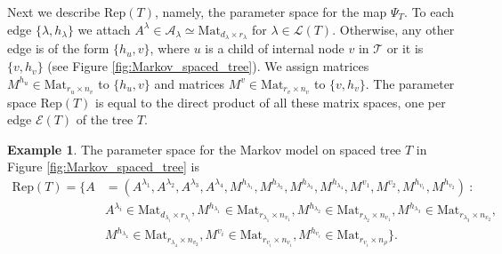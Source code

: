 \documentclass[12pt]{article}
\theoremstyle{definition}
\newtheorem{example}[theorem]{Example}
\numberwithin{theorem}{section}
\begin{document}
Next we describe $\mathrm{Rep}(T)$, namely, the parameter space for the map $\Psi_T$. To each edge $\{\lambda, h_{\lambda}\}$ we attach $A^\lambda \in \mathcal{A}_\lambda \simeq \mathrm{Mat}_{d_\lambda \times r_\lambda}$ for $\lambda \in \mathcal{L}(T)$.  Otherwise, any other edge is of the form $\{h_u, v\}$, where $u$ is a child of internal node $v$ in $\mathscr{T}$ or it is $\{v, h_v\}$ (see Figure \ref{fig:Markov_spaced_tree}). We assign matrices $M^{h_u}  \in \mathrm{Mat}_{r_u \times n_v}$ to $\{h_u, v\}$ and matrices $M^v \in \mathrm{Mat}_{r_v \times n_v}$ to $\{v, h_v\}$. The parameter space $\mathrm{Rep}(T)$ is equal to the direct product of all these matrix spaces, one per edge $\mathcal{E}(T)$ of the tree $T$. 
\begin{example}
    The parameter space for the Markov model on spaced tree $T$ in Figure \ref{fig:Markov_spaced_tree} is
\begin{align*}
    \mathrm{Rep}(T) = \{A&=(A^{\lambda_1}, A^{\lambda_2}, A^{\lambda_3}, A^{\lambda_4}, M^{h_{\lambda_1}}, M^{h_{\lambda_2}}, M^{h_{\lambda_3}}, M^{h_{\lambda_4}}, M^{v_1}, M^{v_2}, M^{h_{v_1}}, M^{h_{v_2}})~:~\\
    &A^{\lambda_i} \in \mathrm{Mat}_{d_{\lambda_i} \times r_{\lambda_i}}, M^{h_{\lambda_1}}\in\mathrm{Mat}_{r_{\lambda_1} \times n_{v_1}}, M^{h_{\lambda_2}}\in\mathrm{Mat}_{r_{\lambda_2} \times n_{v_1}}, M^{h_{\lambda_3}}\in\mathrm{Mat}_{r_{\lambda_3}\times n_{v_2}}, \\
    &M^{h_{\lambda_4}}\in\mathrm{Mat}_{r_{\lambda_4} \times n_{v_2}}, M^{v_i}\in\mathrm{Mat}_{r_{v_i} \times n_{v_i}}, M^{h_{v_i}}\in\mathrm{Mat}_{r_{v_i} \times n_{\rho}}\}.
\end{align*}
\end{example}
\end{document}
